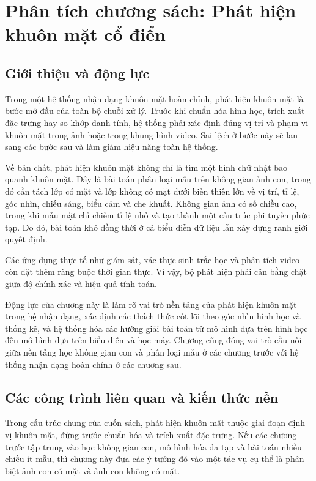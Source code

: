 ﻿%

\chapter{Phân tích chương sách: Phát hiện khuôn mặt cổ điển}

\section{Giới thiệu và động lực}

Trong một hệ thống nhận dạng khuôn mặt hoàn chỉnh, phát hiện khuôn mặt là bước mở đầu của toàn bộ chuỗi xử lý.
Trước khi chuẩn hóa hình học, trích xuất đặc trưng hay so khớp danh tính, hệ thống phải xác định đúng vị trí và phạm vi khuôn mặt trong ảnh hoặc trong khung hình video.
Sai lệch ở bước này sẽ lan sang các bước sau và làm giảm hiệu năng toàn hệ thống.

Về bản chất, phát hiện khuôn mặt không chỉ là tìm một hình chữ nhật bao quanh khuôn mặt.
Đây là bài toán phân loại mẫu trên không gian ảnh con, trong đó cần tách lớp có mặt và lớp không có mặt dưới biến thiên lớn về vị trí, tỉ lệ, góc nhìn, chiếu sáng, biểu cảm và che khuất.
Không gian ảnh có số chiều cao, trong khi mẫu mặt chỉ chiếm tỉ lệ nhỏ và tạo thành một cấu trúc phi tuyến phức tạp.
Do đó, bài toán khó đồng thời ở cả biểu diễn dữ liệu lẫn xây dựng ranh giới quyết định.

Các ứng dụng thực tế như giám sát, xác thực sinh trắc học và phân tích video còn đặt thêm ràng buộc thời gian thực.
Vì vậy, bộ phát hiện phải cân bằng chặt giữa độ chính xác và hiệu quả tính toán.

Động lực của chương này là làm rõ vai trò nền tảng của phát hiện khuôn mặt trong hệ nhận dạng, xác định các thách thức cốt lõi theo góc nhìn hình học và thống kê, và hệ thống hóa các hướng giải bài toán từ mô hình dựa trên hình học đến mô hình dựa trên biểu diễn và học máy.
Chương cũng đóng vai trò cầu nối giữa nền tảng học không gian con và phân loại mẫu ở các chương trước với hệ thống nhận dạng hoàn chỉnh ở các chương sau.  \cite{li2012facechapter}

\section{Các công trình liên quan và kiến thức nền}

Trong cấu trúc chung của cuốn sách, phát hiện khuôn mặt thuộc giai đoạn định vị khuôn mặt, đứng trước chuẩn hóa và trích xuất đặc trưng.
Nếu các chương trước tập trung vào học không gian con, mô hình hóa đa tạp và bài toán nhiều chiều ít mẫu, thì chương này đưa các ý tưởng đó vào một tác vụ cụ thể là phân biệt ảnh con có mặt và ảnh con không có mặt.

